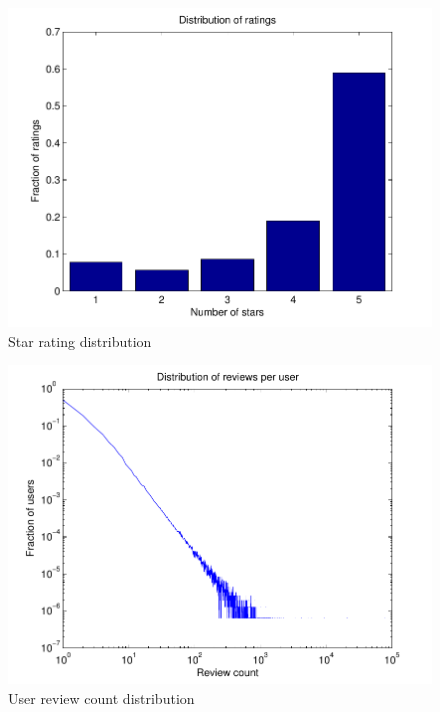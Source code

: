 \documentclass[letterpaper, 10 pt, conference]{ieeeconf}
\begin{document}
\begin{figure}[h]
\includegraphics[scale=0.6]{images/ratings.pdf}
\caption{Star rating distribution}
\label{fig:ratings}
\end{figure}

\begin{figure}[h]
\includegraphics[scale=0.6]{images/user_hist.pdf}
\caption{User review count distribution}
\label{fig:userhist}
\end{figure}
\end{document}

